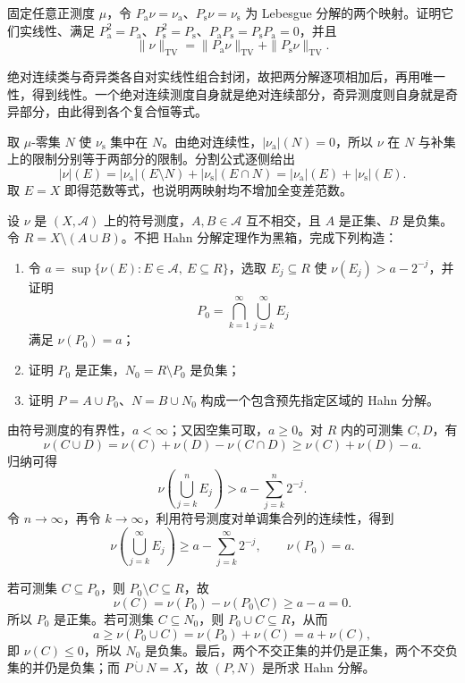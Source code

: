 \begin{exercise}\label{b1:ex:06-lebesgue-projections}
固定任意正测度 \(\mu\)，令 \(P_{\mathrm a}\nu=\nu_{\mathrm a}\)、\(P_{\mathrm s}\nu=\nu_{\mathrm s}\) 为 Lebesgue 分解的两个映射。证明它们实线性、满足 \(P_{\mathrm a}^2=P_{\mathrm a}\)、\(P_{\mathrm s}^2=P_{\mathrm s}\)、\(P_{\mathrm a}P_{\mathrm s}=P_{\mathrm s}P_{\mathrm a}=0\)，并且
\[
\|\nu\|_{\mathrm{TV}}=\|P_{\mathrm a}\nu\|_{\mathrm{TV}}+\|P_{\mathrm s}\nu\|_{\mathrm{TV}}.
\]
\end{exercise}
\begin{solution}
绝对连续类与奇异类各自对实线性组合封闭，故把两分解逐项相加后，再用唯一性，得到线性。一个绝对连续测度自身就是绝对连续部分，奇异测度则自身就是奇异部分，由此得到各个复合恒等式。

取 \(\mu\)-零集 \(N\) 使 \(\nu_{\mathrm s}\) 集中在 \(N\)。由绝对连续性，\(|\nu_{\mathrm a}|(N)=0\)，所以 \(\nu\) 在 \(N\) 与补集上的限制分别等于两部分的限制。分割公式逐侧给出
\[
|\nu|(E)=|\nu_{\mathrm a}|(E\setminus N)+|\nu_{\mathrm s}|(E\cap N)
=|\nu_{\mathrm a}|(E)+|\nu_{\mathrm s}|(E).
\]
取 \(E=X\) 即得范数等式，也说明两映射均不增加全变差范数。
\end{solution}

\begin{exercise}\label{b1:ex:06-hahn-prescribed-sides}
设 \(\nu\) 是 \((X,\mathcal A)\) 上的符号测度，\(A,B\in\mathcal A\) 互不相交，且 \(A\) 是正集、\(B\) 是负集。令 \(R=X\setminus(A\cup B)\)。不把 Hahn 分解定理作为黑箱，完成下列构造：
\begin{enumerate}
\item 令 \(a=\sup\{\nu(E):E\in\mathcal A,\ E\subseteq R\}\)，选取 \(E_j\subseteq R\) 使 \(\nu(E_j)>a-2^{-j}\)，并证明
\[
P_0=\bigcap_{k=1}^{\infty}\bigcup_{j=k}^{\infty}E_j
\]
满足 \(\nu(P_0)=a\)；
\item 证明 \(P_0\) 是正集，\(N_0=R\setminus P_0\) 是负集；
\item 证明 \(P=A\cup P_0\)、\(N=B\cup N_0\) 构成一个包含预先指定区域的 Hahn 分解。
\end{enumerate}
\end{exercise}
\begin{solution}
由符号测度的有界性，\(a<\infty\)；又因空集可取，\(a\geq0\)。对 \(R\) 内的可测集 \(C,D\)，有
\[
\nu(C\cup D)=\nu(C)+\nu(D)-\nu(C\cap D)
\geq \nu(C)+\nu(D)-a.
\]
归纳可得
\[
\nu\!\left(\bigcup_{j=k}^{n}E_j\right)
>a-\sum_{j=k}^{n}2^{-j}.
\]
令 \(n\to\infty\)，再令 \(k\to\infty\)，利用符号测度对单调集合列的连续性，得到
\[
\nu\!\left(\bigcup_{j=k}^{\infty}E_j\right)
\geq a-\sum_{j=k}^{\infty}2^{-j},
\qquad \nu(P_0)=a.
\]

若可测集 \(C\subseteq P_0\)，则 \(P_0\setminus C\subseteq R\)，故
\[
\nu(C)=\nu(P_0)-\nu(P_0\setminus C)\geq a-a=0.
\]
所以 \(P_0\) 是正集。若可测集 \(C\subseteq N_0\)，则 \(P_0\cup C\subseteq R\)，从而
\[
a\geq\nu(P_0\cup C)=\nu(P_0)+\nu(C)=a+\nu(C),
\]
即 \(\nu(C)\leq0\)，所以 \(N_0\) 是负集。最后，两个不交正集的并仍是正集，两个不交负集的并仍是负集；而 \(P\mathbin{\dot\cup}N=X\)，故 \((P,N)\) 是所求 Hahn 分解。
\end{solution}

